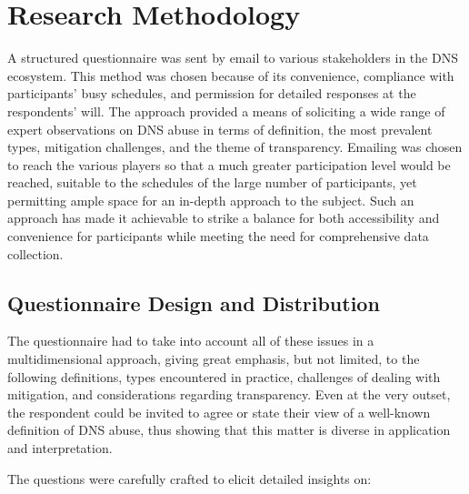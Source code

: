 \chapter{Research Methodology}



A structured questionnaire was sent by email to various stakeholders in the DNS ecosystem. This method was chosen because of its convenience, compliance with participants' busy schedules, and permission for detailed responses at the respondents' will. The approach provided a means of soliciting a wide range of expert observations on DNS abuse in terms of definition, the most prevalent types, mitigation challenges, and the theme of transparency. Emailing was chosen to reach the various players so that a much greater participation level would be reached, suitable to the schedules of the large number of participants, yet permitting ample space for an in-depth approach to the subject. Such an approach has made it achievable to strike a balance for both accessibility and convenience for participants while meeting the need for comprehensive data collection.



\section{Questionnaire Design and Distribution} 

The questionnaire had to take into account all of these issues in a multidimensional approach, giving great emphasis, but not limited, to the following definitions, types encountered in practice, challenges of dealing with mitigation, and considerations regarding transparency. Even at the very outset, the respondent could be invited to agree or state their view of a well-known definition of DNS abuse, thus showing that this matter is diverse in application and interpretation.

The questions were carefully crafted to elicit detailed insights on:

